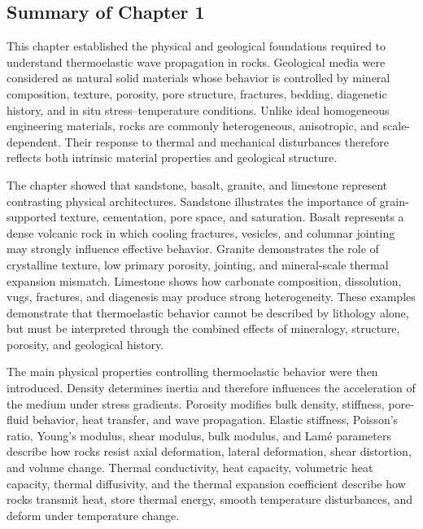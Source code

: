 \subsection{Summary of Chapter 1}

This chapter established the physical and geological foundations required to understand thermoelastic wave propagation in rocks. Geological media were considered as natural solid materials whose behavior is controlled by mineral composition, texture, porosity, pore structure, fractures, bedding, diagenetic history, and in situ stress--temperature conditions. Unlike ideal homogeneous engineering materials, rocks are commonly heterogeneous, anisotropic, and scale-dependent. Their response to thermal and mechanical disturbances therefore reflects both intrinsic material properties and geological structure.

The chapter showed that sandstone, basalt, granite, and limestone represent contrasting physical architectures. Sandstone illustrates the importance of grain-supported texture, cementation, pore space, and saturation. Basalt represents a dense volcanic rock in which cooling fractures, vesicles, and columnar jointing may strongly influence effective behavior. Granite demonstrates the role of crystalline texture, low primary porosity, jointing, and mineral-scale thermal expansion mismatch. Limestone shows how carbonate composition, dissolution, vugs, fractures, and diagenesis may produce strong heterogeneity. These examples demonstrate that thermoelastic behavior cannot be described by lithology alone, but must be interpreted through the combined effects of mineralogy, structure, porosity, and geological history.

The main physical properties controlling thermoelastic behavior were then introduced. Density determines inertia and therefore influences the acceleration of the medium under stress gradients. Porosity modifies bulk density, stiffness, pore-fluid behavior, heat transfer, and wave propagation. Elastic stiffness, Poisson's ratio, Young's modulus, shear modulus, bulk modulus, and Lamé parameters describe how rocks resist axial deformation, lateral deformation, shear distortion, and volume change. Thermal conductivity, heat capacity, volumetric heat capacity, thermal diffusivity, and the thermal expansion coefficient describe how rocks transmit heat, store thermal energy, smooth temperature disturbances, and deform under temperature change.

